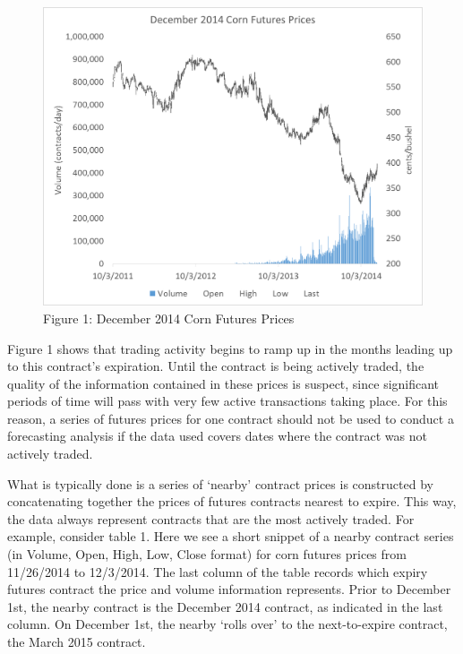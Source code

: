 \documentclass[]{book}
\theoremstyle{definition}
\theoremstyle{definition}
\theoremstyle{remark}
\begin{document}
\begin{figure}[htbp]
\centering
\includegraphics{Excel-files/IntroductiontoCommodityTS-Nearby_construct_files/image005.png}
\caption{Figure 1: December 2014 Corn Futures Prices}
\end{figure}

Figure 1 shows that trading activity begins to ramp up in the months
leading up to this contract's expiration. Until the contract is being
actively traded, the quality of the information contained in these
prices is suspect, since significant periods of time will pass with very
few active transactions taking place. For this reason, a series of
futures prices for one contract should not be used to conduct a
forecasting analysis if the data used covers dates where the contract
was not actively traded.

What is typically done is a series of `nearby' contract prices is
constructed by concatenating together the prices of futures contracts
nearest to expire. This way, the data always represent contracts that
are the most actively traded. For example, consider table 1. Here we see
a short snippet of a nearby contract series (in Volume, Open, High, Low,
Close format) for corn futures prices from 11/26/2014 to 12/3/2014. The
last column of the table records which expiry futures contract the price
and volume information represents. Prior to December 1st, the nearby
contract is the December 2014 contract, as indicated in the last column.
On December 1st, the nearby `rolls over' to the next-to-expire contract,
the March 2015 contract.
\end{document}
